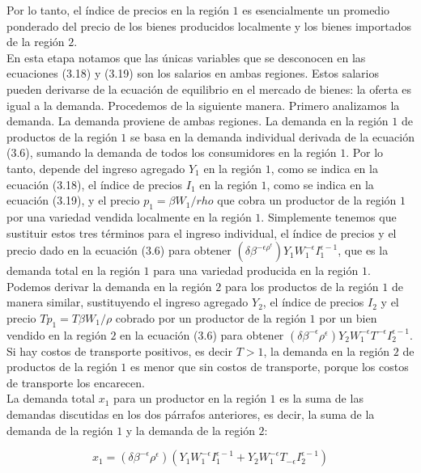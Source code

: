 Por lo tanto, el índice de precios en la región $1$ es esencialmente un promedio ponderado del precio de los bienes producidos localmente y los bienes importados de la región $2$.\\
En esta etapa notamos que las únicas variables que se desconocen en las ecuaciones (3.18) y (3.19) son los salarios en ambas regiones. Estos salarios pueden derivarse de la ecuación de equilibrio en el mercado de bienes: la oferta es igual a la demanda. Procedemos de la siguiente manera. Primero analizamos la demanda. La demanda proviene de ambas regiones. La demanda en la región $1$ de productos de la región $1$ se basa en la demanda individual derivada de la ecuación (3.6), sumando la demanda de todos los consumidores en la región $1$. Por lo tanto, depende del ingreso agregado $Y_1$ en la región $1$, como se indica en la ecuación (3.18), el índice de precios $I_1$ en la región $1$, como se indica en la ecuación (3.19), y el precio $p_1 = \beta W_1/rho$ que cobra un productor de la región $1$ por una variedad vendida localmente en la región $1$. Simplemente tenemos que sustituir estos tres términos para el ingreso individual, el índice de precios y el precio dado en la ecuación (3.6) para obtener $(\delta \beta^{-\epsilon \rho^{\epsilon}})Y_1W_1^{-\epsilon}I_1^{\epsilon-1}$, que es la demanda total en la región $1$ para una variedad producida en la región $1$.\\
Podemos derivar la demanda en la región $2$ para los productos de la región $1$ de manera similar, sustituyendo el ingreso agregado $Y_2$, el índice de precios $I_2$ y el precio $Tp_1 = T\beta W_1/\rho$ cobrado por un productor de la región $1$ por un bien vendido en la región $2$ en la ecuación (3.6) para obtener $(\delta \beta^{-\epsilon }\rho^{\epsilon})Y_2W_1^{-\epsilon} T^{-\epsilon} I_2^{\epsilon-1}$. Si hay costos de transporte positivos, es decir $T > 1$, la demanda en la región $2$ de productos de la región $1$ es menor que sin costos de transporte, porque los costos de transporte los encarecen.\\
La demanda total $x_1$ para un productor en la región $1$ es la suma de las demandas discutidas en los dos párrafos anteriores, es decir, la suma de la demanda de la región $1$ y la demanda de la región $2$:

\begin{equation}
    x_1 = (\delta \beta^{-\epsilon}\rho^\epsilon)(Y_1W_1^{-\epsilon}I_1^{\epsilon-1}+Y_2W_1^{-\epsilon}T_{-\epsilon}I_2^{\epsilon-1})
\end{equation}

